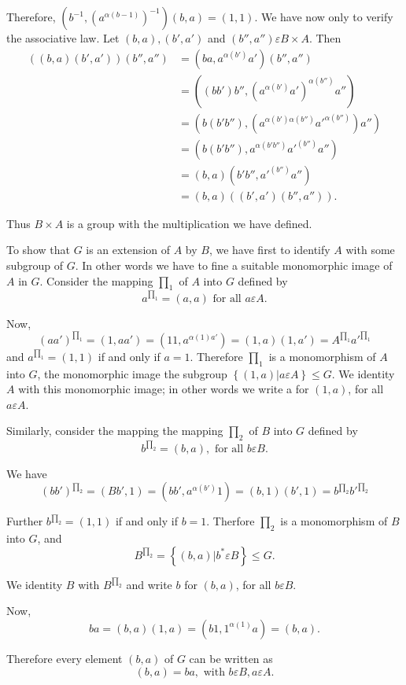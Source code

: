 Therefore, $(b^{-1}, (a^{\alpha(b-1)})^{-1})(b, a) =(1, 1)$. We have
now only to verify the associative law. Let $(b, a), (b', a')$ and
$(b'', a'') \varepsilon B \times A$. Then  
\begin{align*}
((b, a)(b', a'))(b'', a'') &=(ba, a ^{\alpha(b')}a')(b'', a'') \\
  &=((bb')b'', (a^{\alpha (b')}a')^{\alpha (b'')}a '') \\
  &= (b(b'b''), (a^{\alpha (b') \alpha (b'') }a'^{\alpha (b'')}) a'') \\
  &=(b(b'b''),  a^{\alpha (b' b'')}a'^{(b'')} a'') \\
  &=(b,a)(b'b'', a'^{(b'')} a'') \\
  &= (b,a) ((b',a')(b'',a'')). 
\end{align*}

Thus  $B \times A$ is a group with the multiplication we have defined.

To show that $G$ is an extension of  $A$ by $B$, we have first to
identify $A$ with some subgroup of $G$. In other words we have to fine
a suitable monomorphic image of $A$ in $G$. Consider the mapping
$\prod_1$ of $A$ into $G$ defined by 
$$
a^{\prod_1} = (a,a) \text{ for all } a \varepsilon A.
$$

Now,
$$
(aa')^{\prod_1}= (1,aa') = (11,a^{\alpha(1) a'}) = (1,a)(1,a') =
A^{\prod_1} {a'}^{\prod_1} 
$$
and $a^{\prod_1}= (1, 1)$ if and only if $a=1$. Therefore $\prod_1$ is
a monomorphism of $A$ into $G$, the monomorphic image the subgroup
$\left\{ (1, a) \bigg | a \varepsilon A \right\} \le G$. We identity
$A$ with this monomorphic image; in other words we write a for $(1,
a)$, for all $a \varepsilon A$. 

Similarly, consider the mapping the mapping $\prod_2$ of $B$ into $G$
defined by 
$$
b^{\prod _2} = (b,a), \text{ for all } b \varepsilon B.
$$

We have 
$$
(bb')^{\prod_2} = (Bb',1) = (bb',a^{\alpha (b')}1) = (b,1)(b',1)=
b^{\prod_2} {b'}^{\prod_2} 
$$

Further $b^{\prod_2}= (1, 1)$ if and only if $b=1$. Therfore $\prod_2$
is a monomorphism of $B$ into $G$, and  
$$
B^{\prod_2}= \left\{ (b,a) \bigg| b^* \varepsilon B \right\} \le G.
$$

We identity $B$ with $B^{\prod_2}$ and write $b$ for $(b, a)$, for all
$b \varepsilon B$. 

Now, 
$$
ba= (b, a) (1, a)= (b1,1^{\alpha (1)}a) = (b, a).
$$ 

Therefore every element $(b,a)$ of $G$ can be written as 
$$
(b, a)= ba, \text{ with } b \varepsilon B, a  \varepsilon A.
$$

